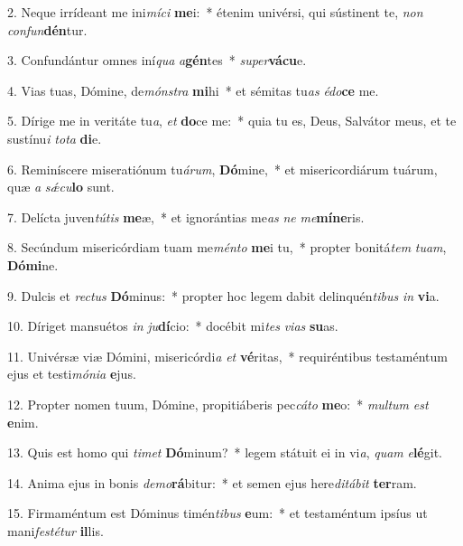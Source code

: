 2. Neque irrídeant me ini\textit{mí}\textit{ci} \textbf{me}i:~*  étenim univérsi, qui sústinent te, \textit{non} \textit{con}\textit{fun}\textbf{dén}tur.\

3. Confundántur omnes iní\textit{qua} \textit{a}\textbf{gén}tes~*  \textit{su}\textit{per}\textbf{vá}\textbf{cu}e.\

4. Vias tuas, Dómine, de\textit{móns}\textit{tra} \textbf{mi}hi~*  et sémitas tu\textit{as} \textit{é}\textit{do}\textbf{ce} me.\

5. Dírige me in veritáte tu\textit{a}, \textit{et} \textbf{do}ce me:~*  quia tu es, Deus, Salvátor meus, et te sustínu\textit{i} \textit{to}\textit{ta} \textbf{di}e.\

6. Reminíscere miseratiónum tu\textit{á}\textit{rum}, \textbf{Dó}mine,~*  et misericordiárum tuárum, quæ \textit{a} \textit{sǽ}\textit{cu}\textbf{lo} sunt.\

7. Delícta juven\textit{tú}\textit{tis} \textbf{me}æ,~*  et ignorántias me\textit{as} \textit{ne} \textit{me}\textbf{mí}\textbf{ne}ris.\

8. Secúndum misericórdiam tuam me\textit{mén}\textit{to} \textbf{me}i tu,~*  propter bonitá\textit{tem} \textit{tu}\textit{am}, \textbf{Dó}\textbf{mi}ne.\

9. Dulcis et \textit{rec}\textit{tus} \textbf{Dó}minus:~*  propter hoc legem dabit delinquén\textit{ti}\textit{bus} \textit{in} \textbf{vi}a.\

10. Díriget mansuétos \textit{in} \textit{ju}\textbf{dí}cio:~*  docébit mi\textit{tes} \textit{vi}\textit{as} \textbf{su}as.\

11. Univérsæ viæ Dómini, misericórdi\textit{a} \textit{et} \textbf{vé}ritas,~*  requiréntibus testaméntum ejus et testi\textit{mó}\textit{ni}\textit{a} \textbf{e}jus.\

12. Propter nomen tuum, Dómine, propitiáberis pec\textit{cá}\textit{to} \textbf{me}o:~*  \textit{mul}\textit{tum} \textit{est} \textbf{e}nim.\

13. Quis est homo qui \textit{ti}\textit{met} \textbf{Dó}minum?~*  legem státuit ei in vi\textit{a}, \textit{quam} \textit{e}\textbf{lé}git.\

14. Anima ejus in bonis \textit{de}\textit{mo}\textbf{rá}bitur:~*  et semen ejus here\textit{di}\textit{tá}\textit{bit} \textbf{ter}ram.\

15. Firmaméntum est Dóminus timén\textit{ti}\textit{bus} \textbf{e}um:~*  et testaméntum ipsíus ut mani\textit{fes}\textit{té}\textit{tur} \textbf{il}lis.\

